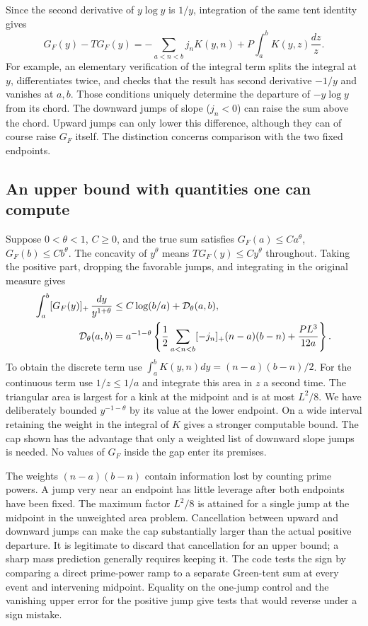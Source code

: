 \documentclass[12pt,letterpaper]{article}
\begin{document}
Since the second derivative of \(y\log y\) is \(1/y\), integration of the same tent identity gives
\begin{equation}
 G_F(y)-T G_F(y)=-\sum_{a<n<b}j_n K(y,n)
                       +P\int_a^b K(y,z)\frac{dz}{z}.
 \label{eq:green}
\end{equation}
For example, an elementary verification of the integral term splits the integral at \(y\), differentiates twice, and checks that the result has second derivative \(-1/y\) and vanishes at \(a,b\). Those conditions uniquely determine the departure of \(-y\log y\) from its chord. The downward jumps of slope (\(j_n<0\)) can raise the sum above the chord. Upward jumps can only lower this difference, although they can of course raise \(G_F\) itself. The distinction concerns comparison with the two fixed endpoints.

\subsection{An upper bound with quantities one can compute}
Suppose \(0<\theta<1\), \(C\ge0\), and the true sum satisfies \(G_F(a)\le Ca^\theta\), \(G_F(b)\le Cb^\theta\). The concavity of \(y^\theta\) means \(T G_F(y)\le C y^\theta\) throughout. Taking the positive part, dropping the favorable jumps, and integrating in the original measure gives
\begin{align}
 \int_a^b [G_F(y)]_+\,\frac{dy}{y^{1+\theta}}
 &\le C\log(b/a)+{\cal D}_\theta(a,b),\label{eq:chordcap}\\
 {\cal D}_\theta(a,b)&=
 a^{-1-\theta}\left\{
 \frac12\sum_{a<n<b}[-j_n]_+(n-a)(b-n)
 +\frac{P L^3}{12a}\right\}. \label{eq:curvaturecap}
\end{align}
To obtain the discrete term use \(\int_a^b K(y,n)dy=(n-a)(b-n)/2\). For the continuous term use \(1/z\le1/a\) and integrate this area in \(z\) a second time. The triangular area is largest for a kink at the midpoint and is at most \(L^2/8\). We have deliberately bounded \(y^{-1-\theta}\) by its value at the lower endpoint. On a wide interval retaining the weight in the integral of \(K\) gives a stronger computable bound. The cap shown has the advantage that only a weighted list of downward slope jumps is needed. No values of \(G_F\) inside the gap enter its premises.

The weights \((n-a)(b-n)\) contain information lost by counting prime powers. A jump very near an endpoint has little leverage after both endpoints have been fixed. The maximum factor \(L^2/8\) is attained for a single jump at the midpoint in the unweighted area problem. Cancellation between upward and downward jumps can make the cap substantially larger than the actual positive departure. It is legitimate to discard that cancellation for an upper bound; a sharp mass prediction generally requires keeping it. The code tests the sign by comparing a direct prime-power ramp to a separate Green-tent sum at every event and intervening midpoint. Equality on the one-jump control and the vanishing upper error for the positive jump give tests that would reverse under a sign mistake.
\end{document}
